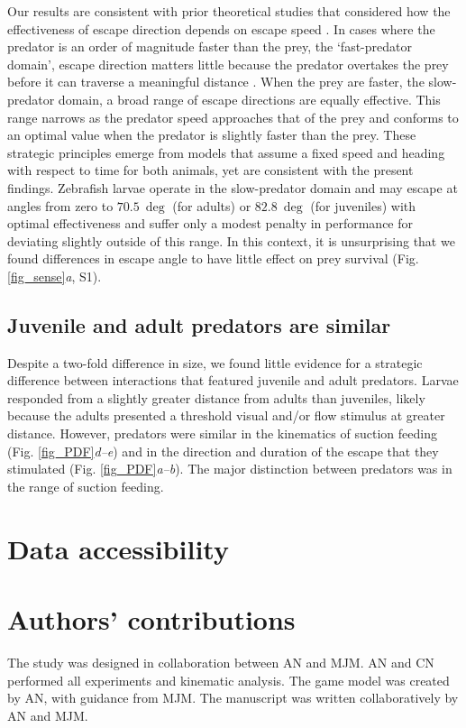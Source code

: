 \documentclass[]{rsos}%
\begin{document}
Our results are consistent with prior theoretical studies that considered how the effectiveness of escape direction depends on escape speed \cite{Isaacs:1965uz,Weihs:1984tb}.
In cases where the predator is an order of magnitude faster than the prey, the `fast-predator domain', escape direction matters little because the predator overtakes the prey before it can traverse a meaningful distance \cite{Soto:2015cj}.
When the prey are faster, the slow-predator domain, a broad range of escape directions are equally effective.
This range narrows as the predator speed approaches that of the prey and conforms to an optimal value when the predator is slightly faster than the prey.
These strategic principles emerge from models that assume a fixed speed and heading with respect to time for both animals, yet are consistent with the present findings. 
Zebrafish larvae operate in the slow-predator domain and may escape at angles from zero to $\SI{70.5}{\deg}$ (for adults) or $\SI{82.8}{\deg}$ (for juveniles) with optimal effectiveness \cite{Soto:2015cj} and suffer only a modest penalty in performance for deviating slightly outside of this range. 
In this context, it is unsurprising that we found differences in escape angle to have little effect on prey survival (Fig. \ref{fig_sense}\textit{a}, S1).

\subsection{Juvenile and adult predators are similar} 

Despite a two-fold difference in size, we found little evidence for a strategic difference between interactions that featured juvenile and adult predators.
Larvae responded from a slightly greater distance from adults than juveniles, likely because the adults presented a threshold visual and/or flow stimulus at greater distance.
However, predators were similar in the kinematics of suction feeding (Fig. \ref{fig_PDF}\textit{d--e}) and in the direction and duration of the escape that they stimulated (Fig. \ref{fig_PDF}\textit{a--b}).
The major distinction between predators was in the range of suction feeding. 

\section*{Data accessibility}


\section*{Authors' contributions}
The study was designed in collaboration between AN and MJM.
AN and CN performed all experiments and kinematic analysis.
The game model was created by AN, with guidance from MJM. 
The manuscript was written collaboratively by AN and MJM.
\end{document}
